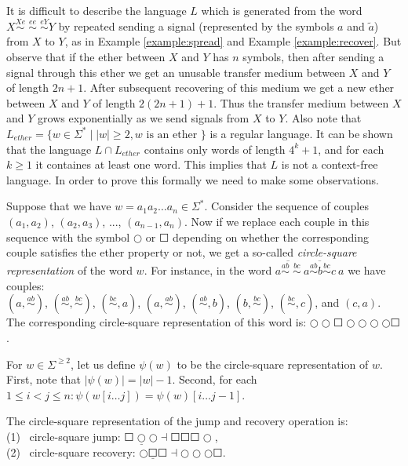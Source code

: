 It is difficult to describe the language $L$ which is generated from the word $X \stackrel{Xe}{\sim} \; \stackrel{ee}{\sim} \; \stackrel{eY}{\sim} Y$ by repeated sending a signal (represented by the symbols $a$ and $\tilde{a}$) from $X$ to $Y$, as in Example \ref{example:spread} and Example \ref{example:recover}. But observe that if the ether between $X$ and $Y$ has $n$ symbols, then after sending a signal through this ether we get an unusable transfer medium between $X$ and $Y$ of length $2n + 1$. After subsequent recovering of this medium we get a new ether between $X$ and $Y$ of length $2(2n+1) + 1$. Thus the transfer medium between $X$ and $Y$ grows exponentially as we send signals from $X$ to $Y$. Also note that $L_{ether} = \{w \in \Sigma^* \mid |w| \ge 2, w \text{ is an ether }\}$ is a regular language. It can be shown that the language $L \cap L_{ether}$ contains only words of length $4^k + 1$, and  for each $k \ge 1$ it containes at least one word. This implies that $L$ is not a context-free language. In order to prove this formally we need to make some observations.

Suppose that we have $w = a_1 a_2 \ldots a_n \in \Sigma^*$. Consider the sequence of couples $(a_1, a_2)$, $(a_2, a_3)$, ..., $(a_{n-1}, a_n)$. Now if we replace each couple in this sequence with the symbol $\Circle$ or $\Square$ depending on whether the
corresponding couple satisfies the ether property or not, we get a so-called \emph{circle-square representation} of the word $w$. For instance, in the word $\overline{a \stackrel{ab}{\sim} \; \stackrel{bc}{\sim}}\ \overline{a \stackrel{ab}{\sim} b \stackrel{bc}{\sim} c}\ a$ we have couples:\\
\indent $(a, \stackrel{ab}{\sim})$,
$(\stackrel{ab}{\sim}, \stackrel{bc}{\sim})$,
$(\stackrel{bc}{\sim}, a)$,
$(a, \stackrel{ab}{\sim})$,
$(\stackrel{ab}{\sim}, b)$,
$(b, \stackrel{bc}{\sim})$,
$(\stackrel{bc}{\sim}, c)$, and
$(c, a)$.\\
The corresponding circle-square representation of this word is: $\Circle \Circle \Square \Circle \Circle \Circle \Circle \Square$.

For $w \in \Sigma^{\ge 2}$, let us define $\psi(w)$ to be the circle-square representation of $w$. First, note that $|\psi(w)| = |w| - 1$. Second, for each $1 \le i < j \le n: \psi(w[i \ldots j]) = \psi(w)[i \ldots j - 1]$.

The circle-square representation of the jump and recovery operation is:\\
\indent \indent (1) \ circle-square jump: $\Square \underline{\Circle} \Circle \dashv \Square \Square \Square \Circle$,\\
\indent \indent (2) \ circle-square recovery: $\Circle \underline{\Square} \Square \dashv \Circle \Circle \Circle \Square$.

